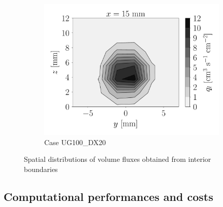 \begin{figure}[ht]
\begin{subfigure}[b]{1.1\textwidth}
   \includegraphics[scale=0.225]{./part2_developments/figures_ch5_resolved_JICF/flow_rates_ibs/spatial_maps/UG100_DX20_x15mm_volume_flux}
   \vspace*{-0.1in}
	\caption{Case UG100\_DX20}
\end{subfigure}

   \caption{Spatial distributions of volume fluxes obtained from interior boundaries}
\label{fig:ibs_spatial_distributions}
\end{figure}

\clearpage

\subsection{Computational performances and costs}
\label{subsec:ch5_computational_performances}

